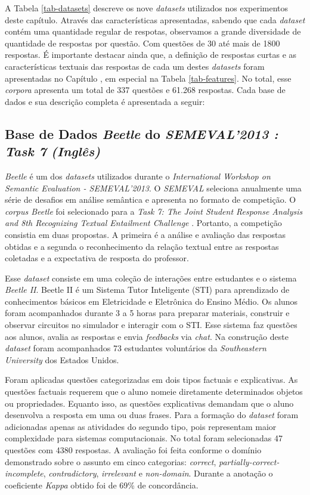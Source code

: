 A Tabela \ref{tab-datasets} descreve os nove \textit{datasets} utilizados nos experimentos deste capítulo. Através das características apresentadas, sabendo que cada \textit{dataset} contém uma quantidade regular de respotas, observamos a grande diversidade de quantidade de respostas por questão. Com questões de 30 até mais de 1800 respostas. É importante destacar ainda que, a definição de respostas curtas e as características textuais das respostas de cada um destes \textit{datasets} foram apresentadas no Capítulo \label{cap1-intro}, em especial na Tabela \ref{tab-features}. No total, esse \textit{corpora} apresenta um total de 337 questões e 61.268 respostas. Cada base de dados e sua descrição completa é apresentada a seguir:


\subsection{Base de Dados \textit{Beetle} do \textit{SEMEVAL'2013 : Task 7} \textit{(Inglês)}}
\label{beetle-db}

\textit{Beetle} \cite{dzikovska2012} é um dos \textit{datasets} utilizados durante o \textit{International Workshop on Semantic Evaluation - SEMEVAL'2013}. O \textit{SEMEVAL} seleciona anualmente uma série de desafios em análise semântica e apresenta no formato de competição. O \textit{corpus Beetle} foi selecionado para a \textit{Task 7: The Joint Student Response Analysis and 8th Recognizing Textual Entailment Challenge} \cite{dzikovska2013}. Portanto, a competição consistia em duas propostas. A primeira é a análise e avaliação das respostas obtidas e a segunda o reconhecimento da relação textual entre as respostas coletadas e a expectativa de resposta do professor.

Esse \textit{dataset} consiste em uma coleção de interações entre estudantes e o sistema \textit{Beetle II}. Beetle II é um Sistema Tutor Inteligente (STI) para aprendizado de conhecimentos básicos em Eletricidade e Eletrônica do Ensino Médio. Os alunos foram acompanhados durante 3 a 5 horas para preparar materiais, construir e observar circuitos no simulador e interagir com o STI. Esse sistema faz questões aos alunos, avalia as respostas e envia \textit{feedbacks} via \textit{chat}. Na construção deste \textit{dataset} foram acompanhados 73 estudantes voluntários da \textit{Southeastern University} dos Estados Unidos.

Foram aplicadas questões categorizadas em dois tipos factuais e explicativas. As questões factuais requerem que o aluno nomeie diretamente determinados objetos ou propriedades. Equanto isso, as questões explicativas demandam que o aluno desenvolva a resposta em uma ou duas frases. Para a formação do \textit{dataset} foram adicionadas apenas as atividades do segundo tipo, pois representam maior complexidade para sistemas computacionais. No total foram selecionadas 47 questões com 4380 respostas. A avaliação foi feita conforme o domínio demonstrado sobre o assunto em cinco categorias: \textit{correct}, \textit{partially-correct-incomplete}, \textit{contradictory}, \textit{irrelevant} e \textit{non-domain}. Durante a anotação o coeficiente \textit{Kappa} obtido foi de 69\% de concordância.


